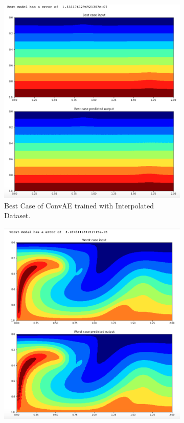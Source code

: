 \begin{figure}[H]
\centering
\begin{subfigure}{0.45\textwidth}
    \includegraphics[width=\textwidth]{figures/mantle_convection_images/larger_dataset_interpolated/ConvAE_Best.png}
    \caption{Best Case of ConvAE trained with Interpolated Dataset.}
\end{subfigure}
\hfill
\begin{subfigure}{0.45\textwidth}
    \includegraphics[width=\textwidth]{figures/mantle_convection_images/larger_dataset_interpolated/ConvAE_Worst.png}

\end{subfigure}
\end{figure}
